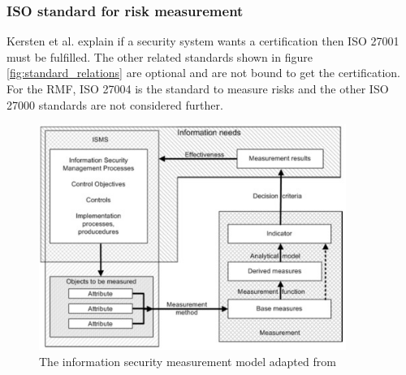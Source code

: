 \subsubsection*{ISO standard for risk measurement}

Kersten et al. \cite{kersten_reuter_schroeder_wolfenstetter_2013} explain if a security system wants a certification then ISO 27001 must be fulfilled. The other related standards shown in figure \ref{fig:standard_relations} are optional and are not bound to get the certification. For the RMF, ISO 27004 is the standard to measure risks and the other ISO 27000 standards are not considered further.

\begin{figure}[ht!]
  \centering
  \includegraphics[width=10cm]{pictures/is_measurement_model.jpg}
  \caption{The information security measurement model adapted from \cite{tarnes2012information}}
  \label{fig:is_measurement_model}
\end{figure}

